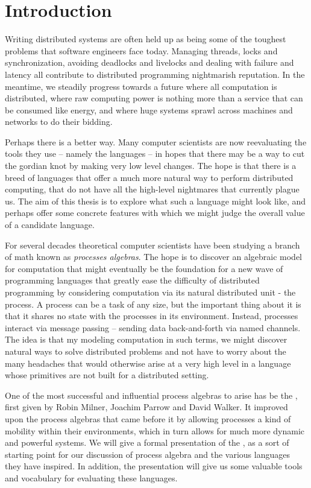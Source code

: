 \chapter{Introduction}
	Writing distributed systems are often held up as being some of the toughest problems that software engineers face today.  Managing threads, locks and synchronization, avoiding deadlocks and livelocks and dealing with failure and latency all contribute to distributed programming nightmarish reputation.  In the meantime, we steadily progress towards a future where all computation is distributed, where raw computing power is nothing more than a service that can be consumed like energy, and where huge systems sprawl across machines and networks to do their bidding.  
	
	Perhaps there is a better way.  Many computer scientists are now reevaluating the tools they use -- namely the languages -- in hopes that there may be a way to cut the gordian knot by making very low level changes.  The hope is that there is a breed of languages that offer a much more natural way to perform distributed computing, that do not have all the high-level nightmares that currently plague us.  The aim of this thesis is to explore what such a language might look like, and perhaps offer some concrete features with which we might judge the overall value of a candidate language.  
	
	
	For several decades theoretical computer scientists have been studying a branch of math known as \emph{processes algebras}.  The hope is to discover an algebraic model for computation that might eventually be the foundation for a new wave of programming languages that greatly ease the difficulty of distributed programming by considering computation via its natural distributed unit - the process.  A process can be a task of any size, but the important thing about it is that it shares no state with the processes in its environment.  Instead, processes interact via message passing -- sending data back-and-forth via named channels.  The idea is that my modeling computation in such terms, we might discover natural ways to solve distributed problems and not have to worry about the many headaches that would otherwise arise at a very high level in a language whose primitives are not built for a distributed setting.
			
	One of the most successful and influential process algebras to arise has be the \picalc, first given by Robin Milner, Joachim Parrow and David Walker.  It improved upon the process algebras that came before it by allowing processes a kind of mobility within their environments, which in turn allows for much more dynamic and powerful systems.  We will give a formal presentation of the \picalc, as a sort of starting point for our discussion of process algebra and the various languages they have inspired.  In addition, the presentation will give us some valuable tools and vocabulary for evaluating these languages.
	
